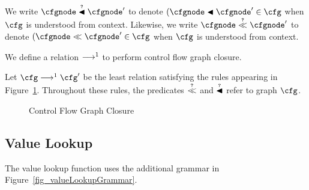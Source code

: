 \documentclass{article}
\begin{document}
    We write $\cfgnode \islexicallyBefore \cfgnode'$ to denote $(\cfgnode \lexicallyBefore \cfgnode' \in \cfg$ when $\cfg$ is understood from context.  Likewise, we write $\cfgnode \isbefore \cfgnode'$ to denote $(\cfgnode \before \cfgnode' \in \cfg$ when $\cfg$ is understood from context.

    We define a relation $\cfgClosureStep$ to perform control flow graph closure.

    \begin{definition}
        Let $\cfg \cfgClosureStep \cfg'$ be the least relation satisfying the rules appearing in Figure~\ref{fig_cfgClosure}.  Throughout these rules, the predicates $\isbefore$ and $\islexicallyBefore$ refer to graph $\cfg$.
    \end{definition}

    \begin{figure}
        \begin{mathpar}


        \end{mathpar}
        \caption{Control Flow Graph Closure}
        \label{fig_cfgClosure}
    \end{figure}

    \subsection{Value Lookup}

    The value lookup function uses the additional grammar in Figure~\ref{fig_valueLookupGrammar}.
\end{document}
